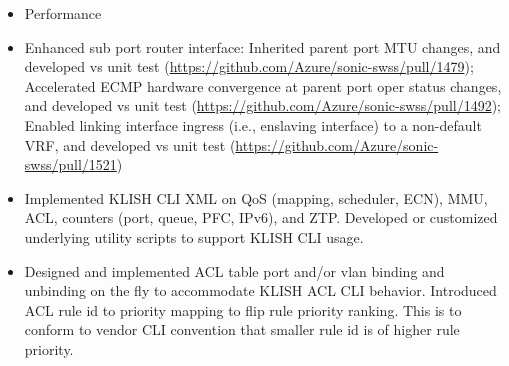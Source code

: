 \documentclass[letterpaper,11pt]{article}
\newcommand{\resitem}[1]{\item #1 \vspace{-2pt}}
\begin{document}
\begin{itemize}
\begin{itemize}
{  Fixed drop counter test failure at more than 1 test run in persistent docker container.}
  \resitem{Performance}
  \resitem{Enhanced sub port router interface: Inherited parent port MTU changes, and developed vs unit test
  (\url{https://github.com/Azure/sonic-swss/pull/1479});
  Accelerated ECMP hardware convergence at parent port oper status changes, and developed vs unit test
  (\url{https://github.com/Azure/sonic-swss/pull/1492});
  Enabled linking interface ingress (i.e., enslaving interface) to a non-default VRF, and developed vs unit test
  (\url{https://github.com/Azure/sonic-swss/pull/1521})}
  \resitem{Implemented KLISH CLI XML on QoS (mapping, scheduler, ECN), MMU, ACL, counters (port, queue, PFC, IPv6), and ZTP.
  Developed or customized underlying utility scripts to support KLISH CLI usage.}
  \resitem{Designed and implemented ACL table port and/or vlan binding and unbinding on the fly to accommodate KLISH ACL CLI behavior.
  Introduced ACL rule id to priority mapping to flip rule priority ranking.
  This is to conform to vendor CLI convention that smaller rule id is of higher rule priority.}
  \end{itemize}


\end{itemize}
\end{document}
